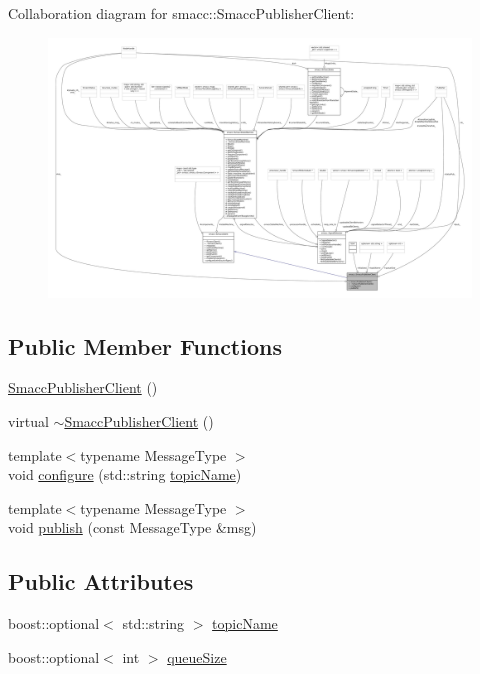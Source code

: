 Collaboration diagram for smacc\+:\+:Smacc\+Publisher\+Client\+:
\nopagebreak
\begin{figure}[H]
\begin{center}
\leavevmode
\includegraphics[width=350pt]{classsmacc_1_1SmaccPublisherClient__coll__graph}
\end{center}
\end{figure}
\subsection*{Public Member Functions}
\begin{DoxyCompactItemize}
\item 
\hyperlink{classsmacc_1_1SmaccPublisherClient_ab68718f6c1846da5069069b6861ade20}{Smacc\+Publisher\+Client} ()
\item 
virtual \hyperlink{classsmacc_1_1SmaccPublisherClient_a081eda5646215dd87b66ff4e086c97c5}{$\sim$\+Smacc\+Publisher\+Client} ()
\item 
{\footnotesize template$<$typename Message\+Type $>$ }\\void \hyperlink{classsmacc_1_1SmaccPublisherClient_a9614fbcc4d566ad8b1b5007727bce2c1}{configure} (std\+::string \hyperlink{classsmacc_1_1SmaccPublisherClient_a4b8401543c3d532e81453c9106ddaefc}{topic\+Name})
\item 
{\footnotesize template$<$typename Message\+Type $>$ }\\void \hyperlink{classsmacc_1_1SmaccPublisherClient_ab82b8234c5bbedf393b70cff442bd5be}{publish} (const Message\+Type \&msg)
\end{DoxyCompactItemize}
\subsection*{Public Attributes}
\begin{DoxyCompactItemize}
\item 
boost\+::optional$<$ std\+::string $>$ \hyperlink{classsmacc_1_1SmaccPublisherClient_a4b8401543c3d532e81453c9106ddaefc}{topic\+Name}
\item 
boost\+::optional$<$ int $>$ \hyperlink{classsmacc_1_1SmaccPublisherClient_ad7a0aa074031d2c2ea332a4d517dbae5}{queue\+Size}
\end{DoxyCompactItemize}
